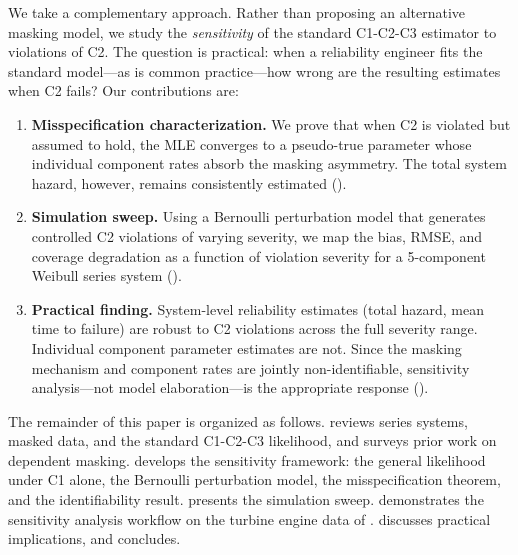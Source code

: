 We take a complementary approach. Rather than proposing an alternative masking
model, we study the \emph{sensitivity} of the standard C1-C2-C3 estimator to
violations of C2. The question is practical: when a reliability engineer fits
the standard model---as is common practice---how wrong are the resulting
estimates when C2 fails? Our contributions are:
\begin{enumerate}
    \item \textbf{Misspecification characterization.} We prove that when C2 is
        violated but assumed to hold, the MLE converges to a pseudo-true
        parameter whose individual component rates absorb the masking
        asymmetry. The total system hazard, however, remains consistently
        estimated ().

    \item \textbf{Simulation sweep.} Using a Bernoulli perturbation model that
        generates controlled C2 violations of varying severity, we map the
        bias, RMSE, and coverage degradation as a function of violation
        severity for a 5-component Weibull series system
        ().

    \item \textbf{Practical finding.} System-level reliability estimates
        (total hazard, mean time to failure) are robust to C2 violations
        across the full severity range. Individual component parameter
        estimates are not. Since the masking mechanism and component rates are
        jointly non-identifiable, sensitivity analysis---not model
        elaboration---is the appropriate response ().
\end{enumerate}

The remainder of this paper is organized as follows. 
reviews series systems, masked data, and the standard C1-C2-C3 likelihood, and
surveys prior work on dependent masking.  develops the
sensitivity framework: the general likelihood under C1 alone, the Bernoulli
perturbation model, the misspecification theorem, and the identifiability
result.  presents the simulation sweep.
 demonstrates the sensitivity analysis workflow on the
turbine engine data of \citet{Huairu-2013}.
 discusses practical implications, and
 concludes.
